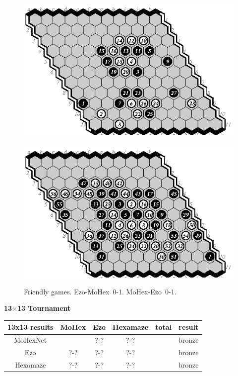 \documentclass{icga}
\def\Eo{\mbox{\sc Ezo}}
\def\Hz{\mbox{\sc Hexamaze}}
\def\Mx{\mbox{\sc MoHex}}
\def\Mt{\mbox{\sc MoHexNet}}
\begin{document}
\begin{figure}[hbp]
\includegraphics[scale=1.3]{games/pix/em-friendly-0-1.eps}\hspace*{-1cm}\
\includegraphics[scale=1.3]{games/pix/me-friendly-0-1.eps}
\caption{Friendly games. \Eo-\Mx\ 0-1. \Mx-\Eo\ 0-1.}
\end{figure}


\newpage
{\large\bf 13$\times$13 Tournament}

\hfill\begin{tabular}{|c|c|c|c|c|c|}
\hline 13x13 results &\Mx{} &\Eo{}  &\Hz{}   & total & result \\ 
\hline \Mt{}         &      &  ?-?    & ?-?  & & bronze \\
\hline \Eo{}         &  ?-? &  ?-?    & ?-?  & & bronze \\
\hline \Hz{}         &  ?-? &  ?-?    & ?-?  & & bronze \\
\hline
\end{tabular}\hfill~
\end{document}
